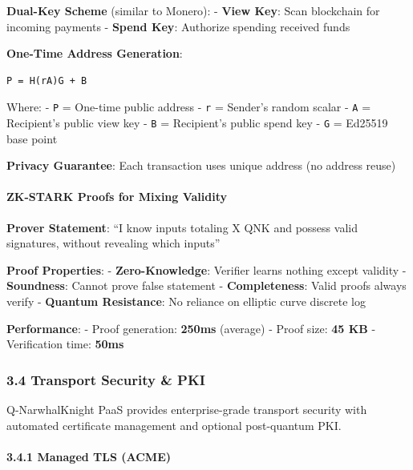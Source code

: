 \documentclass[
  11pt,
]{article}
\begin{document}
\textbf{Dual-Key Scheme} (similar to Monero): - \textbf{View Key}: Scan
blockchain for incoming payments - \textbf{Spend Key}: Authorize
spending received funds

\textbf{One-Time Address Generation}:

\begin{verbatim}
P = H(rA)G + B
\end{verbatim}

Where: - \texttt{P} = One-time public address - \texttt{r} = Sender's
random scalar - \texttt{A} = Recipient's public view key - \texttt{B} =
Recipient's public spend key - \texttt{G} = Ed25519 base point

\textbf{Privacy Guarantee}: Each transaction uses unique address (no
address reuse)

\hypertarget{zk-stark-proofs-for-mixing-validity}{%
\paragraph{ZK-STARK Proofs for Mixing
Validity}\label{zk-stark-proofs-for-mixing-validity}}

\textbf{Prover Statement}: ``I know inputs totaling X QNK and possess
valid signatures, without revealing which inputs''

\textbf{Proof Properties}: - \textbf{Zero-Knowledge}: Verifier learns
nothing except validity - \textbf{Soundness}: Cannot prove false
statement - \textbf{Completeness}: Valid proofs always verify -
\textbf{Quantum Resistance}: No reliance on elliptic curve discrete log

\textbf{Performance}: - Proof generation: \textbf{250ms} (average) -
Proof size: \textbf{45 KB} - Verification time: \textbf{50ms}

\hypertarget{transport-security-pki}{%
\subsubsection{3.4 Transport Security \&
PKI}\label{transport-security-pki}}

Q-NarwhalKnight PaaS provides enterprise-grade transport security with
automated certificate management and optional post-quantum PKI.

\hypertarget{managed-tls-acme}{%
\paragraph{3.4.1 Managed TLS (ACME)}\label{managed-tls-acme}}
\end{document}
